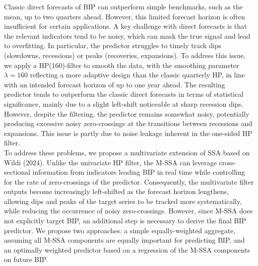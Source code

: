 \documentclass[a4paper]{article}
\begin{document}
Classic direct forecasts of BIP can outperform simple benchmarks, such as the mean, up to two quarters ahead. However, this limited forecast horizon is often insufficient for certain applications. A key challenge with direct forecasts is that the relevant indicators tend to be noisy, which can mask the true signal and lead to overfitting. In particular, the predictor struggles to timely track dips (slowdowns, recessions) or peaks (recoveries, expansions). To address this issue, we apply a HP(160)-filter to smooth the data, with the smoothing parameter $\lambda=160$ reflecting a more adaptive design than the classic quarterly HP, in line with an intended forecast horizon of up to one year ahead. The resulting predictor tends to outperform the classic direct forecasts in terms of statistical significance, mainly due to a slight left-shift noticeable at sharp recession dips. However, despite the filtering, the predictor remains somewhat noisy, potentially producing excessive noisy zero-crossings at the transitions between recessions and expansions. This issue is partly due to noise leakage inherent in the one-sided HP filter. \\

To address these problems, we propose a multivariate extension of SSA based on Wildi (2024). Unlike the univariate HP filter, the M-SSA can leverage cross-sectional information from indicators leading BIP in real time while controlling for the rate of zero-crossings of the predictor. Consequently, the multivariate filter outputs become increasingly left-shifted as the forecast horizon lengthens, allowing dips and peaks of the target series to be tracked more systematically, while reducing the occurrence of noisy zero-crossings. However, since M-SSA does not explicitly target BIP, an additional step is necessary to derive the final BIP predictor. We propose two approaches: a simple equally-weighted aggregate, assuming all M-SSA components are equally important for predicting BIP, and an optimally weighted predictor based on a regression of the M-SSA components on future BIP.\\
\end{document}
